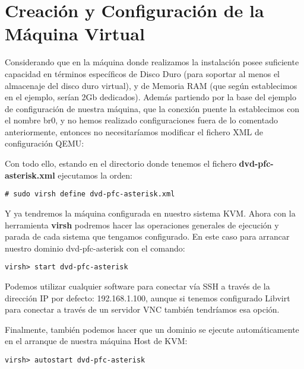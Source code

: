 \section*{Creación y Configuración de la Máquina Virtual}

Considerando que en la máquina donde realizamos la instalación posee suficiente capacidad en términos específicos de Disco Duro (para soportar al menos el almacenaje del disco duro virtual), y de Memoria RAM (que según establecimos en el ejemplo, serían 2Gb dedicados). Además partiendo por la base del ejemplo de configuración de nuestra máquina, que la conexión puente la establecimos con el nombre br0, y no hemos realizado configuraciones fuera de lo comentado anteriormente, entonces no necesitaríamos modificar el fichero XML de configuración QEMU:

Con todo ello, estando en el directorio donde tenemos el fichero \textbf{dvd-pfc-asterisk.xml} ejecutamos la orden:

\begin{lstlisting}[style=consola]
# sudo virsh define dvd-pfc-asterisk.xml
\end{lstlisting}

Y ya tendremos la máquina configurada en nuestro sistema KVM. Ahora con la herramienta \textbf{virsh} podremos hacer las operaciones generales de ejecución y parada de cada sistema que tengamos configurado. En este caso para arrancar nuestro dominio dvd-pfc-asterisk con el comando:

\begin{lstlisting}[style=consola]
virsh> start dvd-pfc-asterisk
\end{lstlisting}

Podemos utilizar cualquier software para conectar vía SSH a través de la dirección IP por defecto: 192.168.1.100, aunque si tenemos configurado Libvirt para conectar a través de un servidor VNC también tendríamos esa opción.

Finalmente, también podemos hacer que un dominio se ejecute automáticamente en el arranque de nuestra máquina Host de KVM:

\begin{lstlisting}[style=consola]
virsh> autostart dvd-pfc-asterisk
\end{lstlisting}